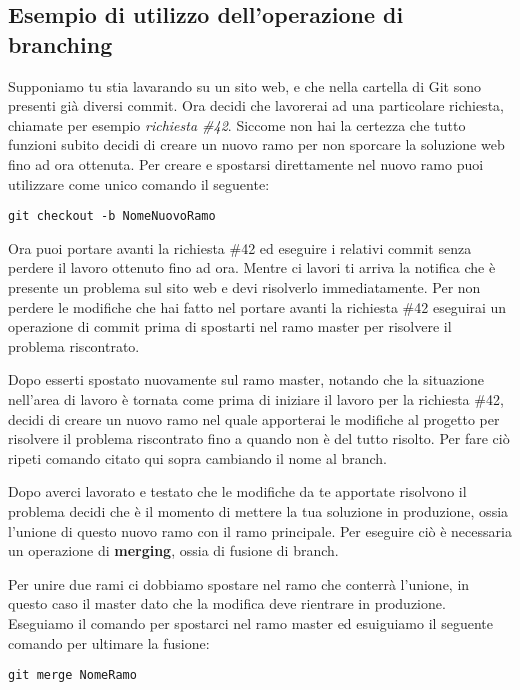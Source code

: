 \subsection{Esempio di utilizzo dell'operazione di branching}
Supponiamo tu stia lavarando su un sito web, e che nella cartella di Git sono presenti già diversi commit. Ora decidi che lavorerai ad una particolare richiesta, chiamate per esempio \textit{richiesta \#42}. Siccome non hai la certezza che tutto funzioni subito decidi di creare un nuovo ramo per non sporcare la soluzione web fino ad ora ottenuta. Per creare e spostarsi direttamente nel nuovo ramo puoi utilizzare come unico comando il seguente:

\begin{center}
\texttt{git checkout -b NomeNuovoRamo}
\end{center}

Ora puoi portare avanti la richiesta \#42 ed eseguire i relativi commit senza perdere il lavoro ottenuto fino ad ora. Mentre ci lavori ti arriva la notifica che è presente un problema sul sito web e devi risolverlo immediatamente. Per non perdere le modifiche che hai fatto nel portare avanti la richiesta \#42 eseguirai un operazione di commit prima di spostarti nel ramo master per risolvere il problema riscontrato.

Dopo esserti spostato nuovamente sul ramo master, notando che la situazione nell'area di lavoro è tornata come prima di iniziare il lavoro per la richiesta \#42, decidi di creare un nuovo ramo nel quale apporterai le modifiche al progetto per risolvere il problema riscontrato fino a quando non è del tutto risolto. Per fare ciò ripeti comando citato qui sopra cambiando il nome al branch.

Dopo averci lavorato e testato che le modifiche da te apportate risolvono il problema decidi che è il momento di mettere la tua soluzione in produzione, ossia l'unione di questo nuovo ramo con il ramo principale. Per eseguire ciò è necessaria un operazione di \textbf{merging}, ossia di fusione di branch.

Per unire due rami ci dobbiamo spostare nel ramo che conterrà l'unione, in questo caso il master dato che la modifica deve rientrare in produzione. Eseguiamo il comando per spostarci nel ramo master ed esuiguiamo il seguente comando per ultimare la fusione:

\begin{center}
\texttt{git merge NomeRamo}
\end{center}

